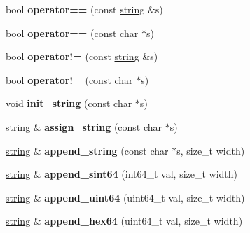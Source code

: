 \begin{DoxyCompactItemize}
\item 
\hypertarget{classstring_a7d16dc67eb549fbbcfede78792763f9f}{}bool {\bfseries operator==} (const \hyperlink{classstring}{string} \&s)\label{classstring_a7d16dc67eb549fbbcfede78792763f9f}

\item 
\hypertarget{classstring_ad71dc291577d973399d62fc63e148b78}{}bool {\bfseries operator==} (const char $\ast$s)\label{classstring_ad71dc291577d973399d62fc63e148b78}

\item 
\hypertarget{classstring_a04e3d28939a97672faa6ed78f71edf7e}{}bool {\bfseries operator!=} (const \hyperlink{classstring}{string} \&s)\label{classstring_a04e3d28939a97672faa6ed78f71edf7e}

\item 
\hypertarget{classstring_a3c1bd042643a239d36e48f490e2ae4e8}{}bool {\bfseries operator!=} (const char $\ast$s)\label{classstring_a3c1bd042643a239d36e48f490e2ae4e8}

\item 
\hypertarget{classstring_a07b38fe4a75e50e475c93c63540e6984}{}void {\bfseries init\+\_\+string} (const char $\ast$s)\label{classstring_a07b38fe4a75e50e475c93c63540e6984}

\item 
\hypertarget{classstring_ad1108488111010be7d1ee27fcfc111b8}{}\hyperlink{classstring}{string} \& {\bfseries assign\+\_\+string} (const char $\ast$s)\label{classstring_ad1108488111010be7d1ee27fcfc111b8}

\item 
\hypertarget{classstring_a640fec2164c5bc9a7f306f8f0fd1c3b9}{}\hyperlink{classstring}{string} \& {\bfseries append\+\_\+string} (const char $\ast$s, size\+\_\+t width)\label{classstring_a640fec2164c5bc9a7f306f8f0fd1c3b9}

\item 
\hypertarget{classstring_ad852bca94b4ef5436125009045e24eff}{}\hyperlink{classstring}{string} \& {\bfseries append\+\_\+sint64} (int64\+\_\+t val, size\+\_\+t width)\label{classstring_ad852bca94b4ef5436125009045e24eff}

\item 
\hypertarget{classstring_a89e5a2463cac66f89981ba552e8589dd}{}\hyperlink{classstring}{string} \& {\bfseries append\+\_\+uint64} (uint64\+\_\+t val, size\+\_\+t width)\label{classstring_a89e5a2463cac66f89981ba552e8589dd}

\item 
\hypertarget{classstring_acfa4025594083b718c0b00b052944279}{}\hyperlink{classstring}{string} \& {\bfseries append\+\_\+hex64} (uint64\+\_\+t val, size\+\_\+t width)\label{classstring_acfa4025594083b718c0b00b052944279}


\end{DoxyCompactItemize}
